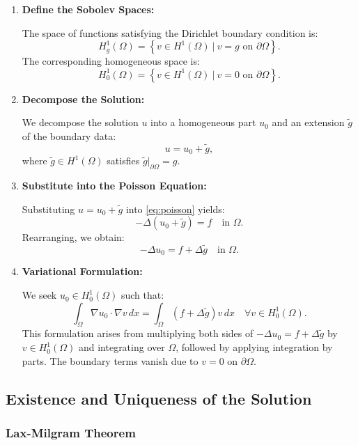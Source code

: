 \documentclass[class=article, crop=false]{standalone}
\begin{document}
\begin{enumerate}
    \item \textbf{Define the Sobolev Spaces:}

    The space of functions satisfying the Dirichlet boundary condition is:
    \[
    H^1_g(\Omega) = \left\{ v \in H^1(\Omega) \ \big| \ v = g \text{ on } \partial\Omega \right\}.
    \]
    The corresponding homogeneous space is:
    \[
    H^1_0(\Omega) = \left\{ v \in H^1(\Omega) \ \big| \ v = 0 \text{ on } \partial\Omega \right\}.
    \]

    \item \textbf{Decompose the Solution:}

    We decompose the solution $u$ into a homogeneous part $u_0$ and an extension $\tilde{g}$ of the boundary data:
    \[
    u = u_0 + \tilde{g},
    \]
    where $\tilde{g} \in H^1(\Omega)$ satisfies $\tilde{g}|_{\partial\Omega} = g$.

    \item \textbf{Substitute into the Poisson Equation:}

    Substituting $u = u_0 + \tilde{g}$ into \eqref{eq:poisson} yields:
    \[
    -\Delta (u_0 + \tilde{g}) = f \quad \text{in } \Omega.
    \]
    Rearranging, we obtain:
    \[
    -\Delta u_0 = f + \Delta \tilde{g} \quad \text{in } \Omega.
    \]

    \item \textbf{Variational Formulation:}

    We seek $u_0 \in H^1_0(\Omega)$ such that:
    \begin{equation}
        \int_{\Omega} \nabla u_0 \cdot \nabla v \, dx = \int_{\Omega} (f + \Delta \tilde{g}) v \, dx \quad \forall v \in H^1_0(\Omega).
        \label{eq:variational}
    \end{equation}
    This formulation arises from multiplying both sides of $-\Delta u_0 = f + \Delta \tilde{g}$ by $v \in H^1_0(\Omega)$ and integrating over $\Omega$, followed by applying integration by parts. The boundary terms vanish due to $v = 0$ on $\partial\Omega$.
\end{enumerate}

\subsection{Existence and Uniqueness of the Solution}

\subsubsection{Lax-Milgram Theorem}
\end{document}
